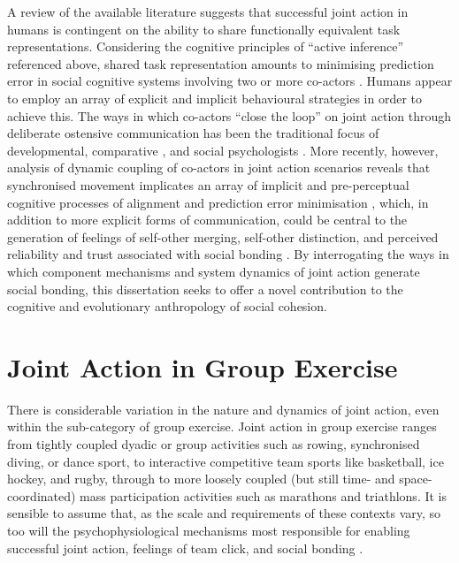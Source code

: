 A review of the available literature suggests that successful joint action in humans is  contingent on the ability to share functionally equivalent task representations. Considering the cognitive principles of ``active inference'' referenced above, shared task representation amounts to minimising prediction error in social cognitive systems involving two or more co-actors \citep{Semin2008,Frith2010}.  Humans appear to employ an array of explicit and implicit behavioural strategies in order to achieve this.   The ways in which co-actors ``close the loop'' \citep{Frith2007} on joint action through deliberate ostensive communication has been the traditional focus of developmental, comparative \cite{Tomasello2005a}, and social psychologists \citep{Sebanz2006}.
More recently, however, analysis of dynamic coupling of co-actors in joint action scenarios reveals that synchronised movement implicates an array of implicit and pre-perceptual cognitive processes of alignment and prediction error minimisation \citep{Schmidt2011}, which, in addition to more explicit forms of communication, could be central to the generation of feelings of self-other merging, self-other distinction, and perceived reliability and trust associated with social bonding \citep{Marsh2009}. By interrogating the ways in which component mechanisms and system dynamics of joint action generate social bonding, this dissertation seeks to offer a novel contribution to the cognitive and evolutionary anthropology of social cohesion.


\section{Joint Action in Group Exercise}
There is considerable variation in the nature and dynamics of joint action, even within the sub-category of group exercise. Joint action in group exercise ranges from tightly coupled dyadic or group activities such as rowing, synchronised diving, or dance sport, to interactive competitive team sports like basketball, ice hockey, and rugby, through to more loosely coupled (but still time- and space-coordinated) mass participation activities such as marathons and triathlons.  It is sensible to assume that, as the scale and requirements of these contexts vary, so too will the psychophysiological mechanisms most responsible for enabling successful joint action, feelings of team click, and social bonding \citep{Mogan2017,Launay2016}.

